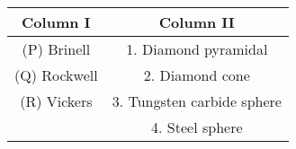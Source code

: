 \begin{tabular}{|c|c|}
\hline 
\textbf{Column I} & \textbf{Column II}\\
\hline 
(P) Brinell & 1. Diamond pyramidal\\
\hline 
(Q) Rockwell & 2. Diamond cone\\
\hline 
(R) Vickers & 3. Tungsten carbide sphere\\
\hline
& 4. Steel sphere\\
\hline
\end{tabular}
